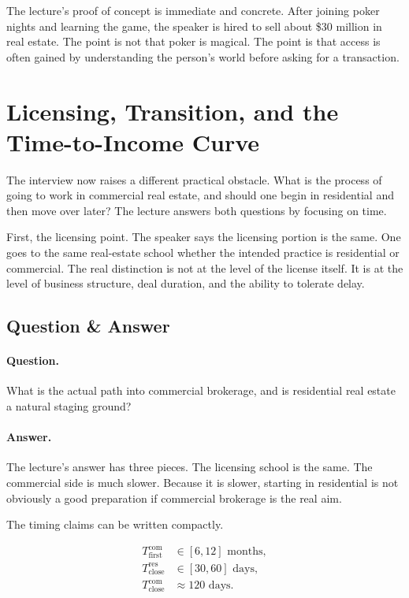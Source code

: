 The lecture's proof of concept is immediate and concrete. After joining poker nights and learning the game, the speaker is hired to sell about \$30 million in real estate. The point is not that poker is magical. The point is that access is often gained by understanding the person's world before asking for a transaction.

\section{Licensing, Transition, and the Time-to-Income Curve}

The interview now raises a different practical obstacle. What is the process of going to work in commercial real estate, and should one begin in residential and then move over later? The lecture answers both questions by focusing on time.

First, the licensing point. The speaker says the licensing portion is the same. One goes to the same real-estate school whether the intended practice is residential or commercial. The real distinction is not at the level of the license itself. It is at the level of business structure, deal duration, and the ability to tolerate delay.

\subsection{Question \& Answer}

\paragraph{Question.}
What is the actual path into commercial brokerage, and is residential real estate a natural staging ground?

\paragraph{Answer.}
The lecture's answer has three pieces. The licensing school is the same. The commercial side is much slower. Because it is slower, starting in residential is not obviously a good preparation if commercial brokerage is the real aim.

The timing claims can be written compactly.

\begin{align}
T_{\text{first}}^{\text{com}} &\in [6,12]\text{ months}, \\
T_{\text{close}}^{\text{res}} &\in [30,60]\text{ days}, \\
T_{\text{close}}^{\text{com}} &\approx 120\text{ days}.
\end{align}

